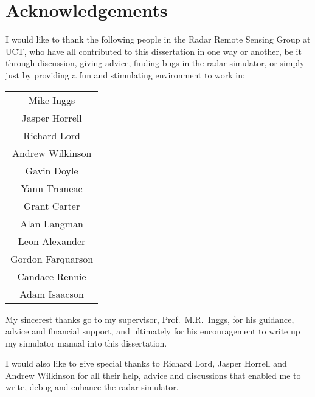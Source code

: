                       

\chapter*{Acknowledgements}

I would like to thank the
following people in the Radar Remote Sensing Group at UCT, who have all
contributed to this dissertation in one way or another, be it through
discussion, giving advice, finding bugs in the radar simulator, or simply
just by providing a fun and stimulating environment to work in:%
\begin{table}[h] \centering%
\begin{tabular}{c}
{\small Mike Inggs} \\ 
{\small Jasper Horrell} \\ 
{\small Richard Lord} \\ 
{\small Andrew Wilkinson} \\ 
{\small Gavin Doyle} \\ 
{\small Yann Tremeac} \\ 
{\small Grant Carter} \\ 
{\small Alan Langman} \\ 
{\small Leon Alexander} \\ 
{\small Gordon Farquarson} \\ 
{\small Candace Rennie} \\ 
{\small Adam Isaacson}
\end{tabular}
\end{table}%

My sincerest thanks go to my supervisor, Prof.~M.R.~Inggs, for his guidance,
advice and financial support, and ultimately for his encouragement to write
up my simulator manual into this dissertation.

I would also like to give special thanks to Richard Lord, Jasper Horrell and
Andrew Wilkinson for all their help, advice and discussions that enabled me
to write, debug and enhance the radar simulator.

\newpage 
